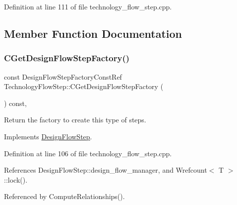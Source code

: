 Definition at line 111 of file technology\+\_\+flow\+\_\+step.\+cpp.



\subsection{Member Function Documentation}
\mbox{\label{classTechnologyFlowStep_a10c1c680300843016dfcd692831845d0}} 
\subsubsection{\texorpdfstring{C\+Get\+Design\+Flow\+Step\+Factory()}{CGetDesignFlowStepFactory()}}
{\footnotesize\ttfamily const Design\+Flow\+Step\+Factory\+Const\+Ref Technology\+Flow\+Step\+::\+C\+Get\+Design\+Flow\+Step\+Factory (\begin{DoxyParamCaption}{ }\end{DoxyParamCaption}) const\hspace{0.3cm}{\ttfamily [override]}, {\ttfamily [virtual]}}



Return the factory to create this type of steps. 



Implements \hyperlink{classDesignFlowStep_a5510a8d296670a07f6b53312c448994c}{Design\+Flow\+Step}.



Definition at line 106 of file technology\+\_\+flow\+\_\+step.\+cpp.



References Design\+Flow\+Step\+::design\+\_\+flow\+\_\+manager, and Wrefcount$<$ T $>$\+::lock().



Referenced by Compute\+Relationships().

